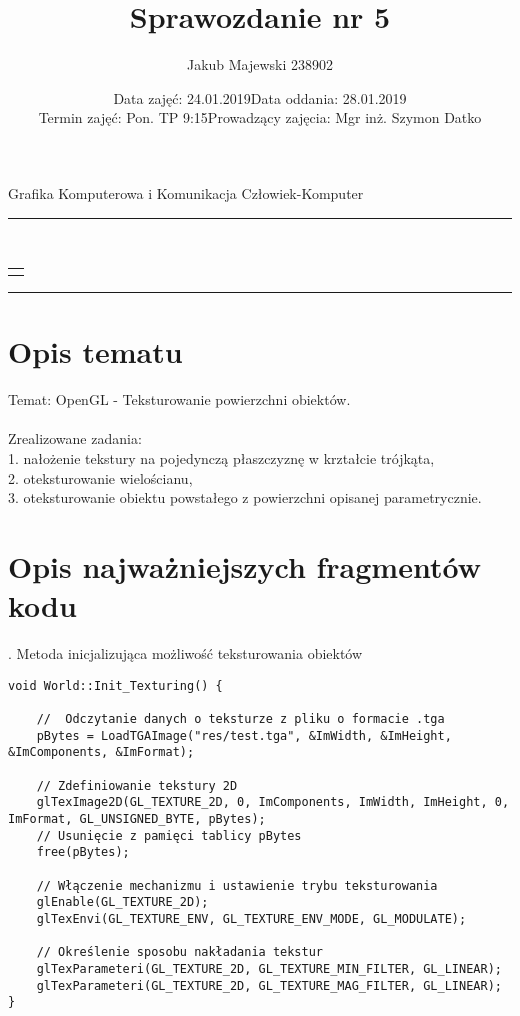 \documentclass[a4paper,11pt]{article}
\date{
{Data zajęć: 24.01.2019\hfill Data oddania: 28.01.2019}
\\
{Termin zajęć: Pon. TP 9:15\hfill Prowadzący zajęcia: Mgr inż. Szymon Datko}
}
\title{Sprawozdanie nr 5}
\author{Jakub Majewski 238902}
\makeatletter
\renewcommand{\maketitle}{
   \begin{titlepage}
     \begin{center}
       {\@date}
       \\
       \par\vspace{3ex}
       {\LARGE\@title}
       \par\vspace{1ex}
       \begin{tabular}[t]{c}
         \@author
       \end{tabular}
     \end{center}
     \@thanks
   \end{titlepage}
}
\makeatother
\begin{document}
\begin{center}\Large
    Grafika Komputerowa i Komunikacja Człowiek-Komputer
\end{center}

\hrule
    {\let\newpage\relax\maketitle}
\hrule


\section{Opis tematu}

Temat: OpenGL - Teksturowanie powierzchni obiektów. \\ \\
Zrealizowane zadania: \\
1. nałożenie tekstury na pojedynczą płaszczyznę w krztałcie trójkąta, \\
2. oteksturowanie wielościanu, \\
3. oteksturowanie obiektu powstałego z powierzchni opisanej parametrycznie. \\


\newpage
\section{Opis najważniejszych fragmentów kodu}

. Metoda inicjalizująca możliwość teksturowania obiektów
\begin{verbatim}
void World::Init_Texturing() {

	//  Odczytanie danych o teksturze z pliku o formacie .tga
	pBytes = LoadTGAImage("res/test.tga", &ImWidth, &ImHeight, &ImComponents, &ImFormat);

	// Zdefiniowanie tekstury 2D 
	glTexImage2D(GL_TEXTURE_2D, 0, ImComponents, ImWidth, ImHeight, 0, ImFormat, GL_UNSIGNED_BYTE, pBytes);
	// Usunięcie z pamięci tablicy pBytes
	free(pBytes);

	// Włączenie mechanizmu i ustawienie trybu teksturowania
	glEnable(GL_TEXTURE_2D);
	glTexEnvi(GL_TEXTURE_ENV, GL_TEXTURE_ENV_MODE, GL_MODULATE);

	// Określenie sposobu nakładania tekstur
	glTexParameteri(GL_TEXTURE_2D, GL_TEXTURE_MIN_FILTER, GL_LINEAR);
	glTexParameteri(GL_TEXTURE_2D, GL_TEXTURE_MAG_FILTER, GL_LINEAR);
}
\end{verbatim}
\newpage
\end{document}
